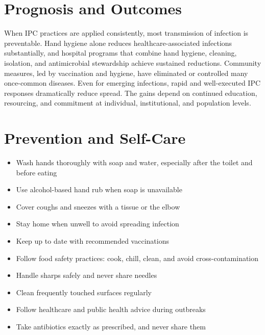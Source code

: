 \section*{Prognosis and Outcomes}
When IPC practices are applied consistently, most transmission of infection is preventable. Hand hygiene alone reduces healthcare-associated infections substantially, and hospital programs that combine hand hygiene, cleaning, isolation, and antimicrobial stewardship achieve sustained reductions. Community measures, led by vaccination and hygiene, have eliminated or controlled many once-common diseases. Even for emerging infections, rapid and well-executed IPC responses dramatically reduce spread. The gains depend on continued education, resourcing, and commitment at individual, institutional, and population levels.

\section*{Prevention and Self-Care}
\begin{itemize}
    \item Wash hands thoroughly with soap and water, especially after the toilet and before eating
    \item Use alcohol-based hand rub when soap is unavailable
    \item Cover coughs and sneezes with a tissue or the elbow
    \item Stay home when unwell to avoid spreading infection
    \item Keep up to date with recommended vaccinations
    \item Follow food safety practices: cook, chill, clean, and avoid cross-contamination
    \item Handle sharps safely and never share needles
    \item Clean frequently touched surfaces regularly
    \item Follow healthcare and public health advice during outbreaks
    \item Take antibiotics exactly as prescribed, and never share them
\end{itemize}

